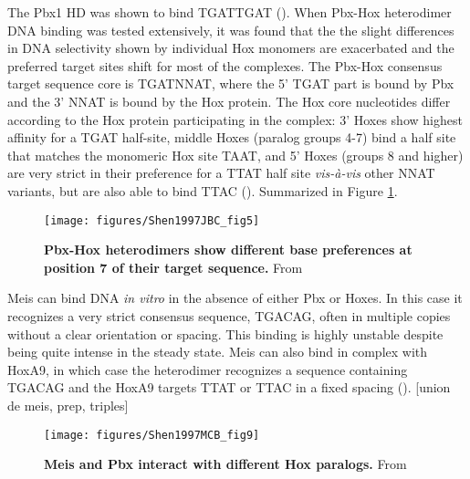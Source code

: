 The Pbx1 \ac{HD} was shown to bind TGATTGAT (\cite{VanDijk1993}). When Pbx-Hox heterodimer DNA binding was tested extensively, it was found that the the slight differences in DNA selectivity shown by individual Hox monomers are exacerbated and the preferred target sites shift for most of the complexes. The Pbx-Hox consensus target sequence core is TGATNNAT, where the 5' TGAT part is bound by Pbx and the 3' NNAT is bound by the Hox protein. The Hox core nucleotides differ according to the Hox protein participating in the complex: 3' Hoxes show highest affinity for a TGAT half-site, middle Hoxes (paralog groups 4-7) bind a half site that matches the monomeric Hox site TAAT, and 5' Hoxes (groups 8 and higher) are very strict in their preference for a TTAT half site \textit{vis-à-vis} other NNAT variants, but are also able to bind TTAC (\cite{Chang1996,Chan1997,Shen1997a}). Summarized in Figure \ref{fig:Shen1997JBC_fig5}.

\begin{figure}[]
  
  \centering
  \label{fig:Shen1997JBC_fig5}
  \texttt{[image: figures/Shen1997JBC\_fig5]}
  \caption[Pbx-Hox heterodimers show different base preferences at position 7 of their target sequence]{\textbf{Pbx-Hox heterodimers show different base preferences at position 7 of their target sequence.} From \cite{Shen1997a}}
\end{figure}

Meis can bind DNA \textit{in vitro} in the absence of either Pbx or Hoxes. In this case it recognizes a very strict consensus sequence, TGACAG, often in multiple copies without a clear orientation or spacing. This binding is highly unstable despite being quite  intense in the steady state. Meis can also bind in complex with HoxA9, in which case the heterodimer recognizes a sequence containing TGACAG and the HoxA9 targets TTAT or TTAC in a fixed spacing (\cite{Shen1997}). 
[union de meis, prep, triples]

\begin{figure}[]
  
  \centering
  \label{fig:Shen1997MCB_fig9}
  \texttt{[image: figures/Shen1997MCB\_fig9]}
  \caption[Meis and Pbx interact with different Hox paralogs]{\textbf{Meis and Pbx interact with different Hox paralogs.} From \cite{Shen1997}}
\end{figure}


